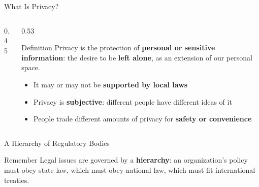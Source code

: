 \documentclass[aspectratio=169,11pt,xcolor={table}]{beamer}
\newcommand{\comma}{,}
\begin{document}
\begin{frame}{What Is Privacy?}
  \begin{columns}[c]
    \begin{column}{0.45\textwidth}
      \centering
    \end{column}
    \begin{column}{0.53\textwidth}
      \begin{block}{Definition}
        \small Privacy is the protection of \textbf{personal or sensitive information}: the desire to be \textbf{left alone}, as an extension of our personal space.
      \end{block}
      \begin{itemize}\small\setlength{\itemsep}{4pt}
        \item It may or may not be \textbf{supported by local laws}
        \item Privacy is \textbf{subjective}: different people have different ideas of it
        \item People trade different amounts of privacy for \textbf{safety or convenience}
      \end{itemize}
    \end{column}
  \end{columns}
\end{frame}

\begin{frame}{A Hierarchy of Regulatory Bodies}
  \centering
  \vspace{3mm}
  \begin{block}{Remember}
    \small Legal issues are governed by a \textbf{hierarchy}: an organization's policy must obey state law, which must obey national law, which must fit international treaties.
  \end{block}
\end{frame}
\end{document}

